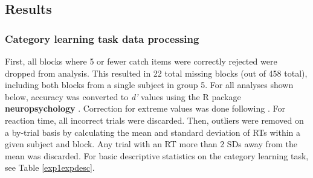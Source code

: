 \documentclass[../dissertation.tex]{subfiles}
\begin{document}
\subsection{Results}

\subsubsection{Category learning task data processing}
	First, all blocks where 5 or fewer catch items were correctly rejected were dropped from analysis. This resulted in 22 total missing blocks (out of 458 total), including both blocks from a single subject in group 5. For all analyses shown below, accuracy was converted to \textit{d'} values \citep{macmillan2004} using the R package \textbf{neuropsychology} \citep{neuropsych}. Correction for extreme values was done following \citep{Hautus1995}. For reaction time, all incorrect trials were discarded. Then, outliers were removed on a by-trial basis by calculating the mean and standard deviation of RTs within a given subject and block. Any trial with an RT more than 2 SDs away from the mean was discarded. For basic descriptive statistics on the category learning task, see Table \ref{exp1expdesc}.   \par
\end{document}
